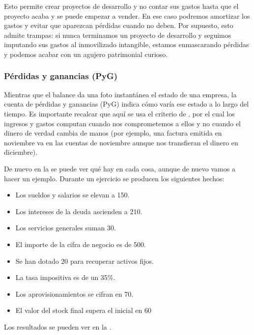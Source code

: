 \documentclass[nochap,palatino,shortheader]{apuntes}
\newcommand{\study}[1]{#1} \newcommand{\substudy}[1]{#1}
\begin{document}
Esto permite crear proyectos de desarrollo y no contar sus gastos hasta que el proyecto acaba y se puede empezar a vender. 
En ese caso podremos amortizar los gastos y evitar que aparezcan pérdidas cuando no deben. Por supuesto, esto admite trampas: si nunca terminamos un proyecto de desarrollo y seguimos imputando sus gastos al inmovilizado intangible, estamos enmascarando pérdidas y podemos acabar con un agujero patrimonial curioso.

\subsubsection{Pérdidas y ganancias (PyG)}

Mientras que el balance da una foto instantánea el estado de una empresa, la \study{cuenta de pérdidas y ganancias (PyG)} indica \substudy{cómo varía ese estado a lo largo del tiempo}. 
Es importante recalcar que aquí se usa el criterio de , por el cual los \substudy{ingresos y gastos computan cuando nos comprometemos} a ellos y no cuando el dinero de verdad cambia de manos (por ejemplo, una factura emitida en noviembre va en las cuentas de noviembre aunque nos transfieran el dinero en diciembre).

De nuevo en la  se puede ver qué hay en cada cosa, aunque de nuevo vamos a hacer un ejemplo. Durante un ejercicio se producen los siguientes hechos:

\begin{itemize}
\item Los sueldos y salarios se elevan a 150.
\item Los intereses de la deuda ascienden a 210.
\item Los servicios generales suman 30.
\item El importe de la cifra de negocio es de 500.
\item Se han dotado 20 para recuperar activos fijos.
\item La tasa impositiva es de un 35\%.
\item Los aprovisionamientos se cifran en 70.
\item El valor del stock final supera el inicial en 60
\end{itemize}

Los resultados se pueden ver en la .
\end{document}

